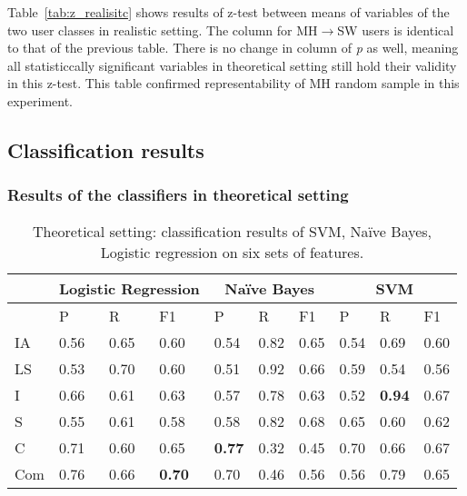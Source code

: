 Table~\ref{tab:z_realisitc} shows results of z-test between means of variables of the two user classes in realistic setting. The column for MH$\rightarrow$SW users is identical to that of the previous table. There is no change in column of \textit{p} as well, meaning all statisticcally significant variables in theoretical setting still hold their validity in this z-test. This table confirmed representability of MH random sample in this experiment.  
\subsection{Classification results}
\subsubsection*{Results of the classifiers in theoretical setting}
\begin{table}[h!]
\noindent\begin{tabularx}{\textwidth}{XXXX|XXX|XXX}
\toprule
&\multicolumn{3}{c}{Logistic Regression}&\multicolumn{3}{|c|}{Na\"ive Bayes}&\multicolumn{3}{c}{SVM} \\
\midrule
& P  & R & F1 & P  & R & F1 &P  & R & F1 \\
\midrule
IA    & 0.56  &0.65 & 0.60 & 0.54  & 0.82 & 0.65 & 0.54  & 0.69 & 0.60 \\
LS    & 0.53  & 0.70 & 0.60 & 0.51  & 0.92 & 0.66 &0.59   & 0.54 & 0.56 \\
I     & 0.66  & 0.61 & 0.63 & 0.57 & 0.78 & 0.63&  0.52 & \textbf{0.94} & 0.67 \\
S    & 0.55  & 0.61 & 0.58 & 0.58 & 0.82 & 0.68 &0.65  & 0.60 & 0.62 \\
C    &   0.71 & 0.60 & 0.65 & \textbf{0.77}  & 0.32 & 0.45 & 0.70  & 0.66 & 0.67 \\
Com & 0.76 & 0.66 & \textbf{0.70} & 0.70  & 0.46 & 0.56 & 0.56  & 0.79 & 0.65 \\
\bottomrule
\end{tabularx}
\caption{Theoretical setting: classification results of SVM, Na\"ive Bayes, Logistic regression on six sets of features.}
\label{tab:theory_result}
\end{table}
